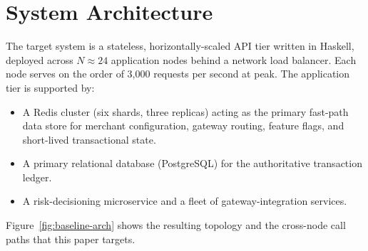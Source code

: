 \section{System Architecture}
The target system is a stateless, horizontally-scaled API tier written in Haskell, deployed across $N \approx 24$ application nodes behind a network load balancer. Each node serves on the order of 3{,}000 requests per second at peak. The application tier is supported by:
\begin{itemize}[leftmargin=*]
    \item A Redis cluster (six shards, three replicas) acting as the primary fast-path data store for merchant configuration, gateway routing, feature flags, and short-lived transactional state.
    \item A primary relational database (PostgreSQL) for the authoritative transaction ledger.
    \item A risk-decisioning microservice and a fleet of gateway-integration services.
\end{itemize}

\noindent Figure~\ref{fig:baseline-arch} shows the resulting topology and the cross-node call paths that this paper targets.

